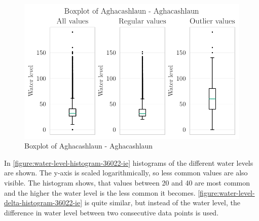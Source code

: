 \begin{figure}[htp]
    \centering
    \includegraphics{./plots/pdfs/36022-ie/boxplot_36022-ie.pdf}
    \caption{Boxplot of Aghacashlaun - Aghacashlaun}
    \label{figure:boxplot-36022-ie}
\end{figure}
\newline
In \autoref{figure:water-level-histogram-36022-ie} histograms of the different water levels are shown. The y-axis is scaled logarithmically, so less common values are also visible. The histogram shows, that values between 20 and 40 are most common and the higher the water level is the less common it becomes. \autoref{figure:water-level-delta-histogram-36022-ie} is quite similar, but instead of the water level, the difference in water level between two consecutive data points is used.
